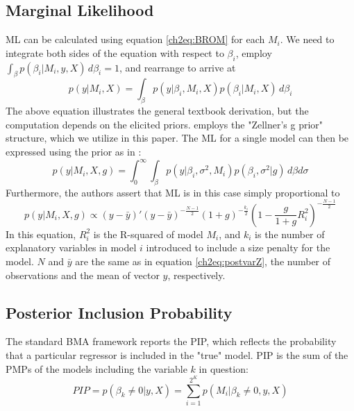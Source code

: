 \begin{refsection}
\subsection{Marginal Likelihood}\label{ch2sec:ML}
\ac{ML} can be calculated using equation \ref{ch2eq:BROM} for each $M_{i}$. We need to integrate both sides of the equation with respect to $\beta_{i}$, employ $\int_{\beta} p(\beta_{i}\vert M_{i},y,X) \, d\beta_{i}=1$, and rearrange to arrive at
%
\begin{equation}\label{ch2eq:ML}
	p(y \vert  M_{i},X) = \int_{\beta}{p(y \vert \beta_{i},M_{i},X)p(\beta_{i} \vert M_{i},X) \, d\beta_{i}}
\end{equation}
The above equation illustrates the general textbook derivation, but the computation depends on the elicited priors. \textcite{Zeugner2011} employs the "Zellner's g prior" structure, which we utilize in this paper. The \ac{ML} for a single model can then be expressed using the prior as in \textcite{FeldkircherZeugner2009}:
\begin{equation}\label{ch2eq:MLFZ}
	p(y \vert  M_{i},X,g) = \int_{0}^{\infty}{\int_{\beta}{p(y \vert \beta_{i}, \sigma^{2},M_{i})p(\beta_{i},\sigma^{2} \vert g) \, d\beta d\sigma}}
\end{equation}
Furthermore, the authors assert that \ac{ML} is in this case simply proportional to
%
\begin{equation}\label{ch2eq:MLg}
	p(y \vert M_{i}, X, g) \propto (y-\bar{y})'(y-\bar{y})^{- \frac{N-1}{2}} (1+g)^{- \frac{k_{i}}{2}} \left(1- \frac{g}{1+g}R^{2}_{i} \right)^{- \frac{N-1}{2}}
\end{equation}
In this equation, $R^{2}_{i}$ is the R-squared of model $M_{i}$, and $k_{i}$ is the number of explanatory variables in model $i$ introduced to include a size penalty for the model. $N$ and $\bar{y}$ are the same as in equation \ref{ch2eq:postvarZ}, the number of observations and the mean of vector $y$, respectively.
\subsection{Posterior Inclusion Probability}
The standard \ac{BMA} framework reports the \ac{PIP}, which reflects the probability that a particular regressor is included in the "true" model. \ac{PIP} is the sum of the \acp{PMP} of the models including the variable $k$ in question:
\begin{equation}\label{ch2eq:PIP}
	PIP = p(\beta_{k} \neq 0 \vert y, X) = \sum_{i=1}^{2^{K}} p(M_{i} \vert \beta_{k} \neq 0, y, X)
\end{equation}

\end{refsection}

